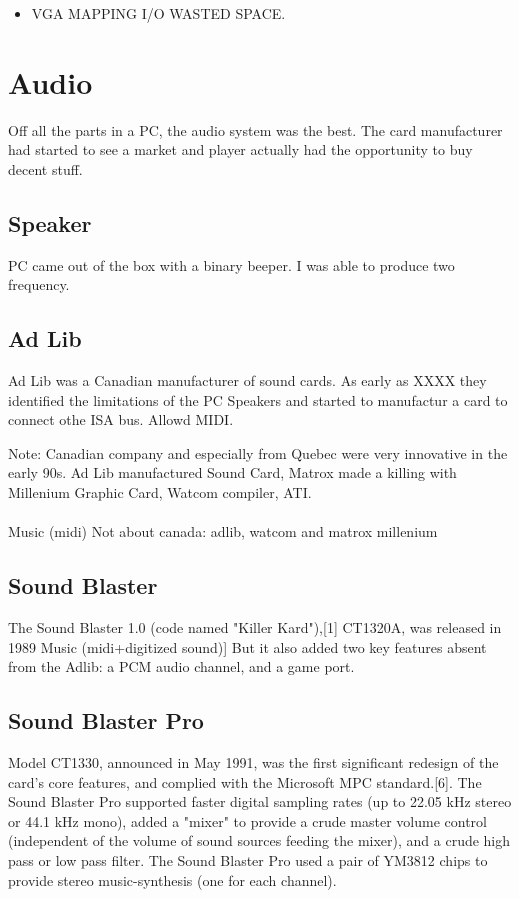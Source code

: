 \documentclass[book.tex]{subfiles}
\begin{document}
\begin{itemize}
\item VGA MAPPING I/O WASTED SPACE.

\end{itemize}





  

\section{Audio}
Off all the parts in a PC, the audio system was the best. The card manufacturer had started to see a market and player actually had the opportunity to buy decent stuff.
  \subsection{Speaker}
  PC came out of the box with a binary beeper. I was able to produce two frequency.
  \subsection{Ad Lib}
  Ad Lib was a Canadian manufacturer of sound cards. As early as XXXX they identified the limitations of the PC Speakers and started to manufactur a card to connect othe ISA bus. Allowd MIDI.
  
  Note: Canadian company and especially from Quebec were very innovative in the early 90s. Ad Lib manufactured Sound Card, Matrox made a killing with Millenium Graphic Card, Watcom compiler, ATI.\\
  
  \\ Music (midi)
  Not about canada: adlib, watcom and matrox millenium
  \subsection{Sound Blaster}
  The Sound Blaster 1.0 (code named "Killer Kard"),[1] CT1320A, was released in 1989
  Music (midi+digitized sound)]  But it also added two key features absent from the Adlib: a PCM audio channel, and a game port.
  \subsection{Sound Blaster Pro}
  Model CT1330, announced in May 1991, was the first significant redesign of the card's core features, and complied with the Microsoft MPC standard.[6]. The Sound Blaster Pro supported faster digital sampling rates (up to 22.05 kHz stereo or 44.1 kHz mono), added a "mixer" to provide a crude master volume control (independent of the volume of sound sources feeding the mixer), and a crude high pass or low pass filter. The Sound Blaster Pro used a pair of YM3812 chips to provide stereo music-synthesis (one for each channel).
\end{document}
